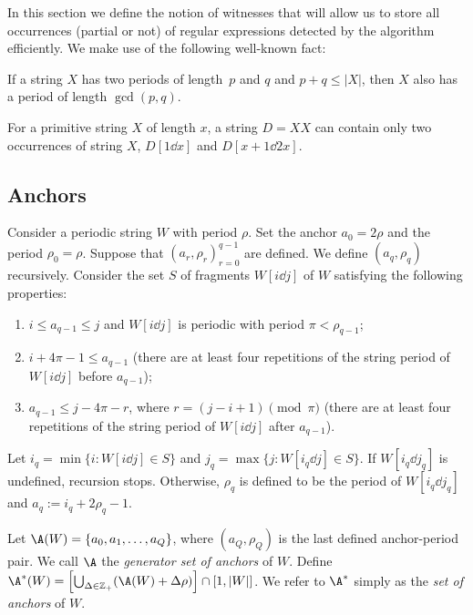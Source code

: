 In this section we define the notion of witnesses that will allow us to store all occurrences (partial or not) of regular expressions detected by the algorithm efficiently. We make use of the following well-known fact:

\begin{fact}\label{fact:fine_wilf}
If a string $X$ has two periods of length~$p$ and $q$ and $p+q \le |X|$, then $X$ also has a period of length $\gcd(p,q)$.
\end{fact}

\begin{corollary}\label{cor:}
For a primitive string $X$ of length $x$, a string $D = XX$ can contain only two occurrences of string $X$, $D[1\dd x]$ and $D[x+1\dd 2x]$.
\end{corollary}

\subsection{Anchors}
\begin{definition}[Anchors]\label{def:anchors}
Consider a periodic string $W$ with period $\rho$. Set the anchor $a_0 = 2\rho$ and the period $\rho_0 = \rho$. Suppose that $(a_r, \rho_r)_{r = 0}^{q-1}$ are defined. We define $(a_{q}, \rho_{q})$ recursively. Consider the set $S$ of fragments $W[i \dd j]$ of $W$ satisfying the following properties:
\begin{enumerate}
\item $i \le a_{q-1} \le j$ and $W[i \dd j]$ is periodic with period $\pi < \rho_{q-1}$;
\item $i+4\pi-1 \le a_{q-1}$ (there are at least four repetitions of the string period of $W[i \dd j]$ before $a_{q-1}$);
\item $a_{q-1} \le j-4\pi-r$, where $r = (j-i+1) \pmod \pi$ (there are at least four repetitions of the string period of $W[i \dd j]$ after $a_{q-1}$).
\end{enumerate}
Let $i_q = \min\{i : W[i\dd j] \in S\}$ and $j_q = \max\{j : W[i_q\dd j] \in S\}$. If $W[i_{q} \dd j_{q}]$ is undefined, recursion stops. Otherwise, $\rho_q$ is defined to be the period of $W[i_q \dd j_q]$ and $a_{q} := i_{q}+2\rho_{q}-1$. 

Let $\A(W) = \{a_0, a_1, \ldots, a_{Q}\}$, where $(a_Q,\rho_Q)$ is the last defined anchor-period pair. We call $\A$ the \emph{generator set of anchors} of $W$. Define $\A^\ast(W) = \left[\bigcup_{\Delta \in \mathbb{Z}_+} (\A(W) + \Delta \rho)\right] \cap [1, |W|]$. We refer to $\A^\ast$ simply as the \emph{set of anchors} of $W$. 
\end{definition}

